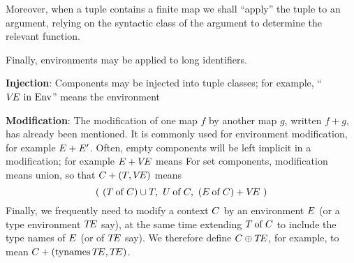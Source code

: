 Moreover, when a tuple contains a finite map we shall ``apply'' the
tuple to an argument, relying on the syntactic class of the argument to
determine the relevant function. 

Finally, environments may be applied to long identifiers.

{\bf Injection}: Components may be injected into tuple classes; for example,\linebreak
``$\VE\ \In\ \Env$'' means the environment

{\bf Modification}: The modification of one map $f$ by another map $g$,
written $f+g$, has already been mentioned.  It is commonly used for
environment modification, for example $E+E'$.  Often, empty components
will be left implicit in a modification; for example $E+\mbox{$V\!E$}$ means
  For set components, modification
means union, so that $C+(T,\mbox{$V\!E$})$ means
\[ (\ (\of{\T}{\C})\cup\T,\ \of{\U}{\C},\ (\of{\E}{\C})+\VE\ ) \]
Finally, we frequently need to modify a context $C$ by an environment $E$
(or a type environment $\mbox{$T\!E$}$ say),
at the same time extending $T \mathbin{\rm of} C$ to include the type names of $E$
(or of $\mbox{$T\!E$}$ say).
We therefore define $C\oplus\mbox{$T\!E$}$, for example, to mean
$C+(\mathop{\rm tynames}\nolimits\mbox{$T\!E$},\mbox{$T\!E$})$.

